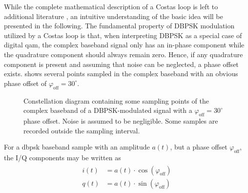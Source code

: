 While the complete mathematical description of a Costas loop is left to additional literature \cite[page 457]{commsys} \cite{costasloops}, an intuitive understanding of the basic idea will be presented in the following.
The fundamental property of DBPSK modulation utilized by a Costas loop is that, when interpreting DBPSK as a special case of digital \gls{qam}, the complex baseband signal only has an in-phase component while the quadrature component should always remain zero.
Hence, if any quadrature component is present and assuming that noise can be neglected, a phase offset exists.
 shows several points sampled in the complex baseband with an obvious phase offset of $\varphi_\mathrm{off} = 30^\circ$.

\begin{figure}[h]
	\centering
	\caption{Constellation diagram containing some sampling points of the complex baseband of a DBPSK-modulated signal with a $\varphi_\mathrm{off} = 30^\circ$ phase offset. Noise is assumed to be negligible. Some samples are recorded outside the sampling interval.}
	\label{fig:costas_constellation}
\end{figure}

For a \gls{dbpsk} baseband sample with an amplitude $a(t)$, but a phase offset $\varphi_\mathrm{off}$, the I/Q components may be written as
\begin{align}
\begin{split}
	i(t) &= a(t) \cdot \cos(\varphi_\mathrm{off}) \\
	q(t) &= a(t) \cdot \sin(\varphi_\mathrm{off})
\end{split}
\end{align}

